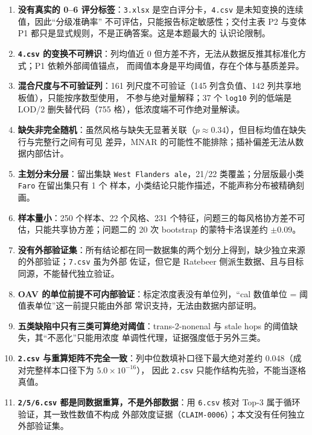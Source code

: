 \documentclass[
  a4paper,12pt]{article}
\newcounter{none} %
\providecommand{\tightlist}{%
  \setlength{\itemsep}{0pt}\setlength{\parskip}{0pt}}
\begin{document}
\begin{enumerate}
\def\labelenumi{\arabic{enumi}.}
\tightlist
\item
  \textbf{没有真实的 0--6 评分标签}：\texttt{3.xlsx}
  是空白评分卡，\texttt{4.csv} 是未知变换的连续值，因此``分级准确率''
  不可评估，只能报告标定敏感性；交付主表 P2 与变体 P1
  都只是显式规则，不是正确答案。这是本题最大的 认识论限制。
\item
  \textbf{\texttt{4.csv} 的变换不可辨识}：列均值近 0
  但方差不齐，无法从数据反推其标准化方式；P1 依赖外部阈值锚点，
  而阈值本身是平均阈值，存在个体与基质差异。
\item
  \textbf{混合尺度与不可验证列}：161 列尺度不可验证（145 列含负值、142
  列共享地板值），只能按序数型使用， 不参与绝对量解释；37 个
  \texttt{log10} 列的低端是 LOD/2 删失替代码（755
  格），低浓度端不可作绝对量解读。
\item
  \textbf{缺失非完全随机}：虽然风格与缺失无显著关联（\(p\approx0.34\)），但目标均值在缺失行与完整行之间有可见
  差异，MNAR 的可能性不能排除；插补偏差无法从数据内部估计。
\item
  \textbf{主划分未分层}：留出集缺 \texttt{West\ Flanders\ ale}，21/22
  类覆盖；分层版最小类 \texttt{Faro} 在留出集只有 1 个
  样本，小类结论只能作描述，不能声称分布被精确刻画。
\item
  \textbf{样本量小}：250 个样本、22 个风格、231
  个特征，问题三的每风格协方差不可估，只能共享协方差；问题二的 20 次
  bootstrap 的蒙特卡洛误差约 \(\pm0.09\)。
\item
  \textbf{没有外部验证集}：所有结论都在同一数据集的两个划分上得到，缺少独立来源的外部验证；\texttt{7.csv}
  虽为外部 佐证，但它是 Ratebeer
  侧派生数据、且与目标同源，不能替代独立验证。
\item
  \textbf{OAV 的单位前提不可内部验证}：标定浓度表没有单位列，``cal
  数值单位 = 阈值表单位''这一前提只能由外部
  常识支持，无法由数据内部证明。
\item
  \textbf{五类缺陷中只有三类可算绝对阈值}：trans-2-nonenal 与 stale hops
  的阈值缺失，其``不恶化''只能用浓度 单调性代理，证据强度低于另外三类。
\item
  \textbf{\texttt{2.csv}
  与重算矩阵不完全一致}：列中位数填补口径下最大绝对差约
  0.048（成对完整样本口径下为 \(5.0\times10^{-16}\)）， 因此
  \texttt{2.csv} 只能作结构先验，不能当逐格真值。
\item
  \textbf{\texttt{2/5/6.csv} 都是同数据重算，不是外部数据}：用
  \texttt{6.csv} 核对 Top-3 属于循环验证，其一致性数值不构成
  外部效度证据（\texttt{CLAIM-0006}）；本文没有任何独立外部验证集。
\end{enumerate}
\end{document}
